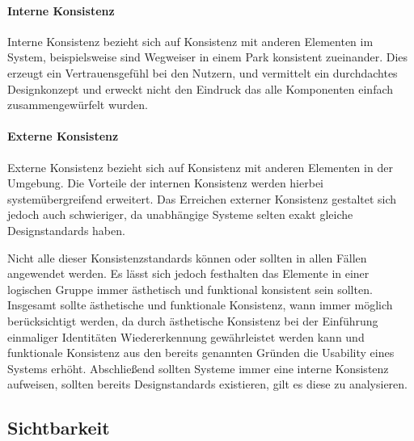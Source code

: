\paragraph{Interne Konsistenz}
Interne Konsistenz bezieht sich auf Konsistenz mit anderen Elementen im System, beispielsweise sind Wegweiser in einem Park konsistent zueinander.
Dies erzeugt ein Vertrauensgefühl bei den Nutzern, und vermittelt ein durchdachtes Designkonzept und erweckt nicht den Eindruck das alle Komponenten einfach zusammengewürfelt wurden.

\paragraph{Externe Konsistenz}
Externe Konsistenz bezieht sich auf Konsistenz mit anderen Elementen in der Umgebung. Die Vorteile der internen Konsistenz werden hierbei systemübergreifend erweitert. Das Erreichen externer Konsistenz gestaltet sich jedoch auch schwieriger, da unabhängige Systeme selten exakt gleiche Designstandards haben.

Nicht alle dieser Konsistenzstandards können oder sollten in allen Fällen angewendet werden. 
Es lässt sich jedoch festhalten das Elemente in einer logischen Gruppe immer ästhetisch und funktional konsistent sein sollten.
Insgesamt sollte ästhetische und funktionale Konsistenz, wann immer möglich berücksichtigt werden, da durch ästhetische Konsistenz bei der Einführung einmaliger Identitäten Wiedererkennung gewährleistet werden kann und funktionale Konsistenz aus den bereits genannten Gründen die Usability eines Systems erhöht.
Abschließend sollten Systeme immer eine interne Konsistenz aufweisen, sollten bereits Designstandards existieren, gilt es diese zu analysieren.\cite{Lidwell.2010}

\subsection*{Sichtbarkeit}

